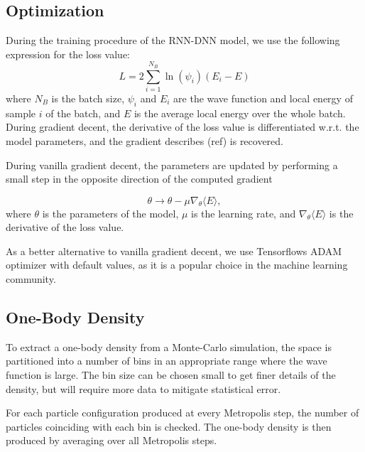 \subsection{Optimization}
During the training procedure of the RNN-DNN model, we use the following expression for the loss value:
\begin{equation*}
	L = 2\sum_{i=1}^{N_B}\ln(\psi_i) (E_i - E)
\end{equation*}
where $N_B$ is the batch size, $\psi_i$ and $E_i$ are the wave function and
local energy of sample $i$ of the batch, and $E$ is the average local energy
over the whole batch. During gradient decent, the derivative of the loss value
is differentiated w.r.t. the model parameters, and the gradient describes (ref)
is recovered. 

During vanilla gradient decent, the parameters are updated by performing a small
step in the opposite direction of the computed gradient 

\begin{equation*}
	\theta \rightarrow \theta - \mu \nabla_\theta \langle E \rangle,
\end{equation*}
where $\theta$ is the parameters of the model, $\mu$ is the learning rate, and $\nabla_\theta \langle E \rangle$ is the derivative of the loss value. 

As a better alternative to vanilla gradient decent, we use Tensorflows ADAM
optimizer with default values, as it is a popular choice in the machine learning
community.   

\subsection{One-Body Density}
To extract a one-body density from a Monte-Carlo simulation, the space is
partitioned into a number of bins in an appropriate range where the wave
function is large. The bin size can be chosen small to get finer details of the
density, but will require more data to mitigate statistical error. 

For each particle configuration produced at every Metropolis step, the number of
particles coinciding with each bin is checked. The one-body density is then
produced by averaging over all Metropolis steps. 


